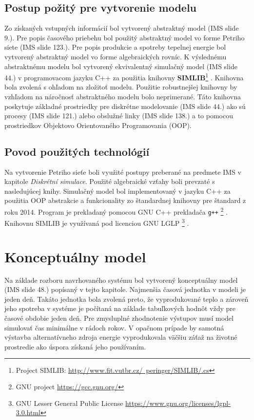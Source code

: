 \documentclass[a4paper, 11pt]{article}
\begin{document}
\subsection{Postup požitý pre vytvorenie modelu}

Zo získaných vstupných informácií bol vytvorený abstraktný model (IMS\cite{ims_slides} slide 9.). Pre popis časového priebehu bol použitý abstraktný model vo forme Petriho siete (IMS\cite{ims_slides} slide 123.). Pre popis produkcie a spotreby tepelnej energie bol vytvorený abstraktný model vo forme algebraických rovníc. K výslednému abstraktnému modelu bol vytvorený ekvivalentný simulačný model (IMS\cite{ims_slides} slide 44.) v programovacom jazyku C++ za použitia knihovny \textbf{SIMLIB}\footnote{Project SIMLIB: \href{http://www.fit.vutbr.cz/~peringer/SIMLIB/.cs}{http://www.fit.vutbr.cz/~peringer/SIMLIB/.cs}} . Knihovna bola zvolená s ohľadom na zložitoť modelu. Použitie robustnejšej knihovny by vzhľadom na náročnosť abstraktného modelu bolo neprimerané. Táto knihovna poskytuje základné prostriedky pre diskrétne modelovanie (IMS\cite{ims_slides} slide 44.) ako sú procesy (IMS\cite{ims_slides} slide 121.) alebo obslužné linky (IMS\cite{ims_slides} slide 138.) a to pomocou prostriedkov Objektovo Orientovaného Programovania (OOP).

\subsection{Povod použitých technológií}
Na vytvorenie Petriho sieťe boli využité postupy preberané na predmete IMS\cite{ims_slides} v kapitole \textit{Diskrétní simulace}. Použité algebraické vzťahy boli prevzaté s nasledujúcej knihy\cite{Cihelka}. Simulačný model bol implementovaný v jazyku C++ za použitia OOP abstrakcie a funkcionality zo štandardnej knihovny pre štandard z roku 2014. Program je prekladaný pomocou GNU C++ prekladača \texttt{g++} \footnote{GNU project \href{https://gcc.gnu.org/}{https://gcc.gnu.org/}} . Knihovnu SIMLIB  je využívaná pod licenciou GNU LGLP \footnote{GNU Lesser General Public License \href{https://www.gnu.org/licenses/lgpl-3.0.html}{https://www.gnu.org/licenses/lgpl-3.0.html}} . 

\section{Konceptuálny model}
Na základe rozboru navrhovaného systému bol vytvorený konceptuálny model (IMS\cite{ims_slides} slide 48.) popísaný v tejto kapitole.  Najmenšia časová jednotka v modeli je jeden deň. Takáto jednotka bola zvolená preto, že vyprodukované teplo a zároveň jeho spotreba v systéme je počítaná na základe tabuľkových hodnôt vždy pre časové obdobie jeden deň. Pre zmysluplné zhodnotenie výstupov musí model simulovať čas minimálne v rádoch rokov. V opačnom prípade by samotná výstavba alternatívneho zdroja energie vyprodukovala väčšiu záťaž na životné prostredie ako úspora získaná jeho používaním. 
\end{document}
